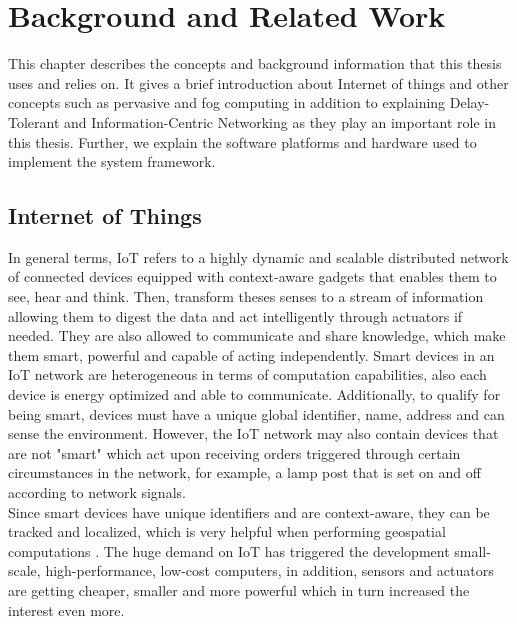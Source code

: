 
\chapter{Background and Related Work}\label{chapter:background}

This chapter describes the concepts and background information that this thesis uses and relies on. It gives a brief introduction about Internet of things and other concepts such as pervasive and fog computing in addition to  explaining Delay-Tolerant and Information-Centric Networking as they play an important role in this thesis. Further, we explain the software platforms and hardware used to implement the system framework.

\section{Internet of Things}

In general terms, IoT refers to a highly dynamic and scalable distributed network of connected devices equipped with context-aware gadgets that enables them to see, hear and think\cite{DAC:DAC2417}. Then, transform theses senses to a stream of information allowing them to digest the data and act intelligently through actuators if needed. They are also allowed to communicate and share knowledge, which make them smart, powerful and capable of acting independently. Smart devices in an IoT network are heterogeneous in terms of computation capabilities, also each device is energy optimized and able to communicate. Additionally, to qualify for being smart, devices must have a unique global identifier, name, address and can sense the environment. However, the IoT network may also contain devices that are not "smart" which act upon receiving orders triggered through certain circumstances in the network, for example, a lamp post that is set on and off according to network signals. \\

\noindent Since smart devices have unique identifiers and are context-aware, they can be tracked and localized, which is very helpful when performing geospatial computations \cite{Miorandi20121497}. The huge demand on IoT has triggered the development small-scale, high-performance, low-cost computers, in addition, sensors and actuators are getting cheaper, smaller and more powerful which in turn increased the interest even more.\\
 

